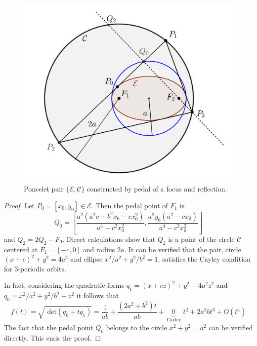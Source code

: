 \begin{figure} 
	\begin{center}
		\includegraphics[scale=0.5]{chap_09/pics/pics-09-012-par_circulo_elipse.pdf}
		\caption {Poncelet pair $\{\mathcal{E},\mathcal{C}\}$ constructed by pedal of a focus and reflection.   }
	\end{center}
	\label{fig:elipse_circulo}
\end{figure}

\begin{proof} Let $P_0=[x_0,y_0]\in\mathcal{E}$.
Then the pedal point of $F_1$ is 
\[  Q_0=  \left[\frac{a^2(a^2 c + b^2 x_0 - cx_0^2)}{  a^4-c^2x_0^2  } , \frac{a^2 y_0(a^2 - c x_0)}{a^4 - c^2x_0^2 } \right] \]
and $Q_2=2Q_2-F_0$. Direct calculations show that   $Q_2$ is a point of the circle $\mathcal{C}$ centered at $F_1=[-c,0]$ and radius $2a$.  
It can be verified that the pair,  circle $(x+c)^2+y^2=4a^2$ and   ellipse $x^2/a^2+y^2/b^2=1$, satisfies the Cayley  condition  for 3-periodic orbits.  

In fact, considering the quadratic forms 
$q_1=(x+cz)^2+y^2-4a^2z^2$ and 
 $q_0=x^2/a^2+y^2/b^2-z^2$ it follows that
 \[ f(t)=\sqrt{\textrm{ det}( q_0+tq_1)}= \frac{1}{ab}+\frac{(2a^2 + b^2)t}{ab}   +%
 \underbrace{0}_{ \mathrm{\ Cayley }}
 \;t^2+2a^3 b t^3 + O(t^4)\]
 The fact that the pedal point $Q_0$ belongs to  the circle $x^2+y^2=a^2$ can be verified directly.
  This ends the proof. 
\end{proof}



